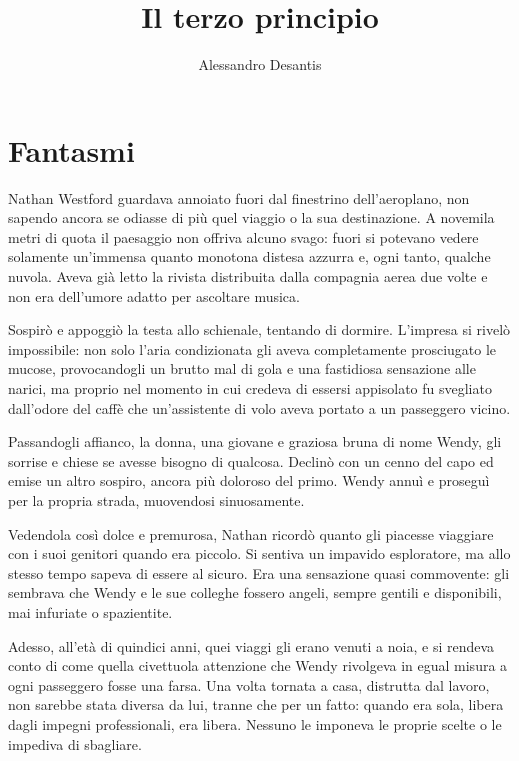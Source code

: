 \documentclass[a4paper,oneside,9pt]{memoir}
\title{Il terzo principio}
\author{Alessandro Desantis}
\date{}
\begin{document}
\begin{titlingpage}
\maketitle
\end{titlingpage}

\chapter{Fantasmi}

Nathan Westford guardava annoiato fuori dal finestrino dell'aeroplano, non sapendo ancora se odiasse di più quel
viaggio o la sua destinazione. A novemila metri di quota il paesaggio non offriva alcuno svago: fuori si potevano vedere
solamente un'immensa quanto monotona distesa azzurra e, ogni tanto, qualche nuvola. Aveva già letto la rivista
distribuita dalla compagnia aerea due volte e non era dell'umore adatto per ascoltare musica.

Sospirò e appoggiò la testa allo schienale, tentando di dormire. L'impresa si rivelò impossibile: non solo l'aria
condizionata gli aveva completamente prosciugato le mucose, provocandogli un brutto mal di gola e una fastidiosa
sensazione alle narici, ma proprio nel momento in cui credeva di essersi appisolato fu svegliato dall'odore del caffè
che un'assistente di volo aveva portato a un passeggero vicino.

Passandogli affianco, la donna, una giovane e graziosa bruna di nome Wendy, gli sorrise e chiese se avesse bisogno di
qualcosa. Declinò con un cenno del capo ed emise un altro sospiro, ancora più doloroso del primo. Wendy annuì e
proseguì per la propria strada, muovendosi sinuosamente.

Vedendola così dolce e premurosa, Nathan ricordò quanto gli piacesse viaggiare con i suoi genitori quando era piccolo.
Si sentiva un impavido esploratore, ma allo stesso tempo sapeva di essere al sicuro. Era una sensazione quasi
commovente: gli sembrava che Wendy e le sue colleghe fossero angeli, sempre gentili e disponibili, mai infuriate o
spazientite.

Adesso, all'età di quindici anni, quei viaggi gli erano venuti a noia, e si rendeva conto di come quella civettuola
attenzione che Wendy rivolgeva in egual misura a ogni passeggero fosse una farsa. Una volta tornata a casa, distrutta
dal lavoro, non sarebbe stata diversa da lui, tranne che per un fatto: quando era sola, libera dagli impegni
professionali, era libera. Nessuno le imponeva le proprie scelte o le impediva di sbagliare.
\end{document}
